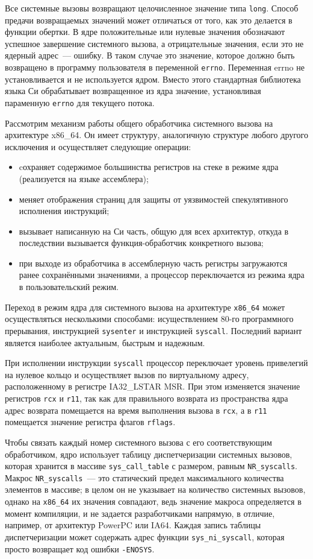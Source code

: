 Все системные вызовы возвращают целочисленное значение типа \texttt{long}.
Способ предачи возвращаемых значений может отличаться от того, как это делается
в функции обертки. В ядре положительные или нулевые значения обозначают успешное
завершение системного вызова, а отрицательные значения, если это не ядерный
адрес~--- ошибку. В таком случае это значение, которое должно быть возвращено в
программу пользователя в переменной \texttt{errno}. Переменная errno не
установливается и не используется ядром. Вместо этого стандартная библиотека
языка Си обрабатывает возвращенное из ядра значение, установливая параменную
\texttt{errno} для текущего потока.

Рассмотрим механизм работы общего обработчика системного вызова на архитектуре
x86\_64. Он имеет структуру, аналогичную структуре любого другого исключения и
осуществляет следующие операции:
\begin{itemize}
\item cохраняет содержимое большинства регистров на стеке в режиме ядра
  (реализуется на языке ассемблера);
\item меняет отображения страниц для защиты от уязвимостей спекулятивного
  исполнения инструкций;
\item вызывает написанную на Си часть, общую для всех архитектур, откуда в
  последствии вызывается функция-обработчик конкретного вызова;
\item при выходе из обработчика в ассемблерную часть регистры загружаются ранее
  сохранёнными значениями, а процессор переключается из режима ядра в
  пользовательский режим.
\end{itemize}

Переход в режим ядра для системного вызова на архитектуре \texttt{x86\_64} может
осуществляться несколькими способами: исуществлением 80-го программного
прерывания, инструкцией \texttt{sysenter} и инструкцией \texttt{syscall}.
Последний вариант является наиболее актуальным, быстрым и надежным.

При исполнении инструкции \texttt{syscall} процессор переключает уровень
привелегий на нулевое кольцо и осуществляет вызов по виртуальному адресу,
расположенному в регистре IA32\_LSTAR MSR. При этом изменяется значение
регистров \texttt{rcx} и \texttt{r11}, так как для правильного возврата из
пространства ядра адрес возврата помещается на время выполнения вызова в
\texttt{rcx}, а в \texttt{r11} помещается значение регистра флагов
\texttt{rflags}.

Чтобы связать каждый номер системного вызова с его соответствующим обработчиком,
ядро использует таблицу диспетчеризации системных вызовов, которая хранится в
массиве \texttt{sys\_call\_table} с размером, равным \texttt{NR\_syscalls}.
Макрос \texttt{NR\_syscalls}~--- это статический предел максимального количества
элементов в массиве; в целом он не указывает на количество системных вызовов,
однако на \texttt{x86\_64} их значения совпадают, ведь значение макроса
определяется в момент компиляции, и не задается разработчиками напрямую, в
отличие, например, от архитектур PowerPC или IA64. Каждая запись таблицы
диспетчеризации может содержать адрес функции \texttt{sys\_ni\_syscall}, которая
просто возвращает код ошибки \texttt{-ENOSYS}.

